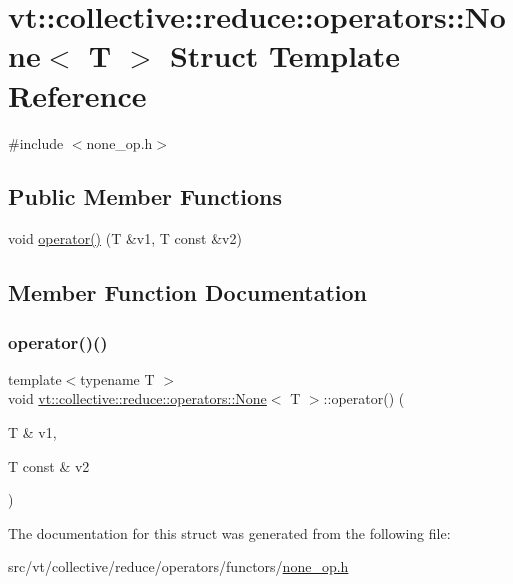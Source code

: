 \hypertarget{structvt_1_1collective_1_1reduce_1_1operators_1_1_none}{}\section{vt\+:\+:collective\+:\+:reduce\+:\+:operators\+:\+:None$<$ T $>$ Struct Template Reference}
\label{structvt_1_1collective_1_1reduce_1_1operators_1_1_none}


{\ttfamily \#include $<$none\+\_\+op.\+h$>$}

\subsection*{Public Member Functions}
\begin{DoxyCompactItemize}
\item 
void \hyperlink{structvt_1_1collective_1_1reduce_1_1operators_1_1_none_a21a949adb69db6514790012afa945b73}{operator()} (T \&v1, T const \&v2)
\end{DoxyCompactItemize}


\subsection{Member Function Documentation}
\mbox{\label{structvt_1_1collective_1_1reduce_1_1operators_1_1_none_a21a949adb69db6514790012afa945b73}} 
\subsubsection{\texorpdfstring{operator()()}{operator()()}}
{\footnotesize\ttfamily template$<$typename T $>$ \\
void \hyperlink{structvt_1_1collective_1_1reduce_1_1operators_1_1_none}{vt\+::collective\+::reduce\+::operators\+::\+None}$<$ T $>$\+::operator() (\begin{DoxyParamCaption}\item[{T \&}]{v1,  }\item[{T const \&}]{v2 }\end{DoxyParamCaption})\hspace{0.3cm}{\ttfamily [inline]}}



The documentation for this struct was generated from the following file\+:\begin{DoxyCompactItemize}
\item 
src/vt/collective/reduce/operators/functors/\hyperlink{none__op_8h}{none\+\_\+op.\+h}\end{DoxyCompactItemize}
